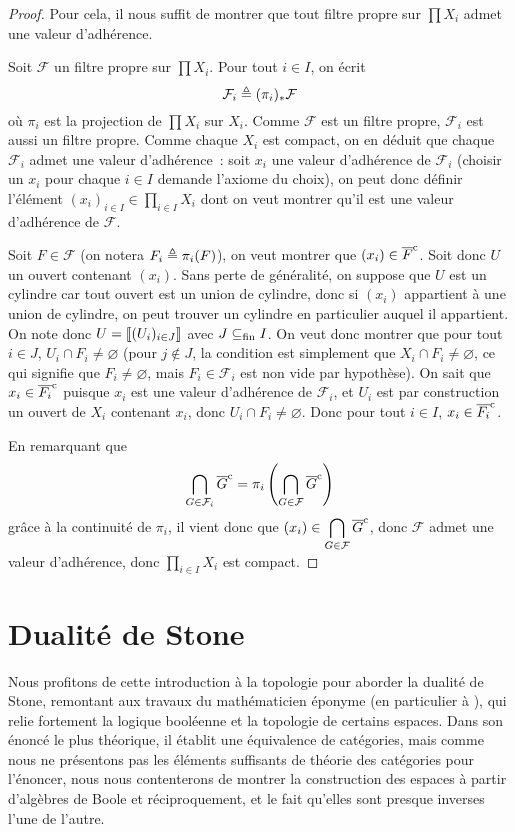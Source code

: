 \begin{proof}
  Pour cela, il nous suffit de montrer que tout filtre propre sur $\prod X_i$
  admet une valeur d'adhérence.

  Soit $\mathcal F$ un filtre propre sur $\prod X_i$. Pour tout $i\in I$, on
  écrit
  \[\mathcal F_i \triangleq (\pi_i)_*\mathcal F\]
  où $\pi_i$ est la projection de $\prod X_i$ sur $X_i$. Comme $\mathcal F$ est
  un filtre propre, $\mathcal F_i$ est aussi un filtre propre. Comme
  chaque $X_i$ est compact, on en déduit que chaque $\mathcal F_i$ admet une
  valeur d'adhérence~: soit $x_i$ une valeur d'adhérence de $\mathcal F_i$
  (choisir un $x_i$ pour chaque $i\in I$ demande l'axiome du choix), on
  peut donc définir l'élément
  $\displaystyle (x_i)_{i\in I}\in \prod_{i \in I}X_i$
  dont on veut montrer qu'il est une valeur d'adhérence de $\mathcal F$.

  Soit $F\in \mathcal F$ (on notera $F_i \triangleq \pi_i(F)$), on veut montrer que
  $(x_i)\in \overline{F}^{\mathrm c}$. Soit donc $U$ un ouvert contenant $(x_i)$. Sans perte de
  généralité, on suppose que $U$ est un cylindre car tout ouvert est un union
  de cylindre, donc si $(x_i)$ appartient à une union de cylindre, on peut
  trouver un cylindre en particulier auquel il appartient. On note donc
  $U = \llbracket (U_i)_{i\in J}\rrbracket$ avec $J\subseteq_{\mathrm{fin}} I$. On veut donc montrer que pour
  tout $i\in J$, $U_i\cap F_i\neq\varnothing$ (pour $j\notin J$, la condition
  est simplement que $X_i \cap F_i\neq\varnothing$, ce qui signifie que
  $F_i\neq\varnothing$, mais $F_i\in\mathcal F_i$ est non vide par hypothèse).
  On sait que $x_i \in \overline{F_i}^{\mathrm c}$ puisque $x_i$ est une valeur d'adhérence de
  $\mathcal F_i$, et $U_i$ est par construction un ouvert de $X_i$ contenant
  $x_i$, donc $U_i\cap F_i \neq\varnothing$. Donc pour tout $i\in I$,
  $x_i\in \overline{F_i}^{\mathrm c}$.

  En remarquant que
  \[\bigcap_{G \in \mathcal F_i}\overline{G}^{\mathrm c} =
  \pi_i\left(\bigcap_{G \in \mathcal F} \overline{G}^{\mathrm c}\right)\]
  grâce à la continuité de $\pi_i$, il vient donc que
  $\displaystyle (x_i) \in \bigcap_{G \in\mathcal F}\overline{G}^{\mathrm c}$, donc $\mathcal F$
  admet une valeur d'adhérence, donc $\displaystyle\prod_{i\in I} X_i$ est
  compact.
\end{proof}

\section{Dualité de Stone}

Nous profitons de cette introduction à la topologie pour aborder la dualité de
Stone, remontant aux travaux du mathématicien éponyme (en particulier à
\cite{StoneDuality}), qui relie fortement la logique booléenne et la topologie de
certains espaces. Dans son énoncé le plus théorique, il établit une équivalence
de catégories, mais comme nous ne présentons pas les éléments suffisants de
théorie des catégories pour l'énoncer, nous nous contenterons de montrer la
construction des espaces à partir d'algèbres de Boole et réciproquement, et le
fait qu'elles sont presque inverses l'une de l'autre.

